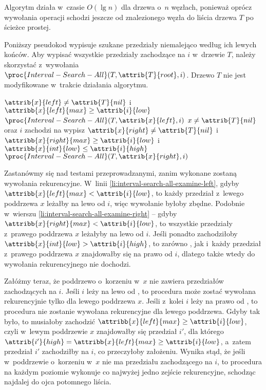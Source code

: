 Algorytm działa w~czasie $O(\lg n)$ dla drzewa o~$n$ węzłach, ponieważ oprócz wywołania operacji  schodzi jeszcze od znalezionego węzła do liścia drzewa $T$ po ścieżce prostej.

\exercise %

\noindent Poniższy pseudokod wypisuje szukane przedziały niemalejąco według ich lewych końców.
Aby wypisać wszystkie przedziały zachodzące na $i$ w~drzewie $T$, należy skorzystać z~wywołania $\proc{Interval-Search-All}(T,\attrib{T}{root},i)$.
Drzewo $T$ nie jest modyfikowane w~trakcie działania algorytmu.
\begin{codebox}
\li	\If $\attrib{x}{left}\ne\attrib{T}{nil}$ i~$\attribb{x}{left}{max}\ge\attrib{i}{low}$ \label{li:interval-search-all-examine-left}
\li		\Then $\proc{Interval-Search-All}(T,\attrib{x}{left},i)$
		\End
\li \If $x\ne\attrib{T}{nil}$ oraz $i$ zachodzi na  \label{li:interval-search-all-overlap}
\li		\Then wypisz 
		\End
\li	\If $\attrib{x}{right}\ne\attrib{T}{nil}$ i~$\attribb{x}{right}{max}\ge\attrib{i}{low}$ i~$\attribb{x}{int}{low}\le\attrib{i}{high}$ \label{li:interval-search-all-examine-right}
\li		\Then $\proc{Interval-Search-All}(T,\attrib{x}{right},i)$
		\End
\end{codebox}

Zastanówmy się nad testami przeprowadzanymi, zanim wykonane zostaną wywołania rekurencyjne.
W~linii \ref{li:interval-search-all-examine-left}, gdyby $\attribb{x}{left}{max}<\attrib{i}{low}$, to każdy przedział z~lewego poddrzewa $x$ leżałby na lewo od $i$, więc wywołanie byłoby zbędne.
Podobnie w~wierszu \ref{li:interval-search-all-examine-right} -- gdyby $\attribb{x}{right}{max}<\attrib{i}{low}$, to wszystkie przedziały z~prawego poddrzewa $x$ leżałyby na lewo od $i$.
Jeśli ponadto zachodziłoby $\attribb{x}{int}{low}>\attrib{i}{high}$, to zarówno , jak i~każdy przedział z~prawego poddrzewa $x$ znajdowałby się na prawo od $i$, dlatego także wtedy do wywołania rekurencyjnego nie dochodzi.

Załóżmy teraz, że poddrzewo o~korzeniu w~$x$ nie zawiera przedziałów zachodzących na $i$.
Jeśli $i$ leży na lewo od , to procedura może zostać wywołana rekurencyjnie tylko dla lewego poddrzewa $x$.
Jeśli z~kolei $i$ leży na prawo od , to procedura nie zostanie wywołana rekurencyjne dla lewego poddrzewa.
Gdyby tak było, to musiałoby zachodzić $\attribb{x}{left}{max}\ge\attrib{i}{low}$, czyli w~lewym poddrzewie $x$ znajdowałby się przedział $i'$, dla którego $\attrib{i'}{high}=\attribb{x}{left}{max}\ge\attrib{i}{low}$, a~zatem przedział $i'$ zachodziłby na $i$, co przeczyłoby założeniu.
Wynika stąd, że jeśli w~poddrzewie o~korzeniu w~$x$ nie ma przedziału zachodzącego na $i$, to procedura na każdym poziomie wykonuje co najwyżej jedno zejście rekurencyjne, schodząc najdalej do ojca potomnego liścia.


